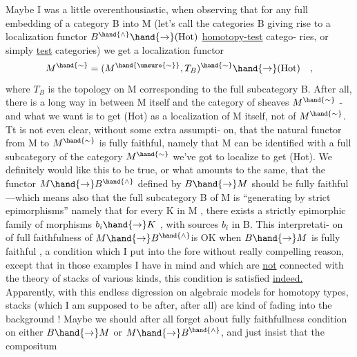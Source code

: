 
Maybe I was a little overenthousiastic, when observing that for
any full embedding of a category B into M (let's call the categories B
giving rise to a localization functor $B^{\hand{\wedge}} \hand{\to} (\mathrm{Hot})$ \uline{homotopy-test} catego-%
ries, or simply \uline{test} categories) we get a localization functor
\[ M^{\hand{\sim}} = (M^{\hand{\unsure{\sim}}},T_B)^{\hand{\sim}} \hand{\to} (\mathrm{Hot}) \quad , \]
where $T_B$ is the topology on M corresponding to the full subcategory B.
After all, there is a long way in between M itself and the category of
sheaves $M^{\hand{\sim}}$ - and what we want is to get (Hot) as a localization of M
itself, not of $M^{\hand{\sim}}$. Tt is not even clear, without some extra assumpti-%
on, that the natural functor from M to $M^{\hand{\sim}}$ is fully faithful, namely
that M can be identified with a full subcategory of the category $M^{\hand{\sim}}$
we've got to localize to get (Hot). We definitely would like this to
be true, or what amounts to the same, that the functor $M \hand{\to} B^{\hand{\wedge}}$
defined by $B \hand{\to} M$ should be fully faithful ---which means also that
the full subcategory B of M is ``generating by strict epimorphisms''
namely that for every K in M , there exists a strictly epimorphic
family of morphisms $b_i \hand{\to} K$ , with sources $b_i$ in B. This interpretati-%
on of full faithfulness of $M \hand{\to} B^{\hand{\wedge}}$is OK when $B \hand{\to} M$ is fully faithful ,
a condition which I  put into the fore without really compelling reason,
except that in those examples I have in mind and which are \uline{not} connected
with the theory of stacks of various kinds, this condition is satisfied
\margin{$\lrcorner\!\ulcorner$}\uline{indeed.}\hand{$\rfloor\!\lceil$} Apparently, with this endless digression on algebraic models
for homotopy types,  stacks (which I am supposed to be after, after
all) are kind of fading into the background ! Maybe we should after
all forget about fully faithfullness condition on either $B \hand{\to} M$ or
$M \hand{\to} B^{\hand{\wedge}}$, and just insist that the compositum
